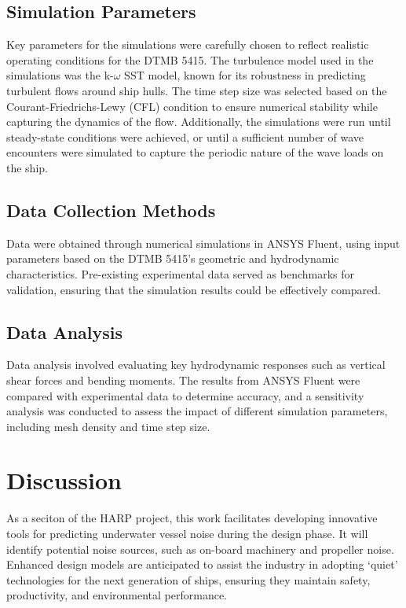 \documentclass[12pt]{article} %
\begin{document}
\subsection{Simulation Parameters}
Key parameters for the simulations were carefully chosen to reflect realistic operating conditions 
for the DTMB 5415. The turbulence model used in the simulations was the k-$\omega$ SST model, known for its 
robustness in predicting turbulent flows around ship hulls. The time step size was selected based on 
the Courant-Friedrichs-Lewy (CFL) condition to ensure numerical stability while capturing the dynamics 
of the flow. Additionally, the simulations were run until steady-state conditions were achieved, or until 
a sufficient number of wave encounters were simulated to capture the periodic nature of the wave loads 
on the ship.

\subsection{Data Collection Methods}
Data were obtained through numerical simulations in ANSYS Fluent, using input parameters based on the 
DTMB 5415’s geometric and hydrodynamic characteristics. Pre-existing experimental data served as 
benchmarks for validation, ensuring that the simulation results could be effectively compared.

\subsection{Data Analysis}
Data analysis involved evaluating key hydrodynamic responses such as vertical shear forces and bending 
moments. The results from ANSYS Fluent were compared with experimental data to determine accuracy, 
and a sensitivity analysis was conducted to assess the impact of different simulation parameters, 
including mesh density and time step size.








\clearpage
\section{Discussion}
As a seciton of the HARP project, this work facilitates developing innovative tools for predicting underwater vessel noise during the design phase. It will identify potential noise sources, such as on-board machinery and propeller noise. Enhanced design models are anticipated to assist the industry in adopting `quiet' technologies for the next generation of ships, ensuring they maintain safety, productivity, and environmental performance.
\end{document}
